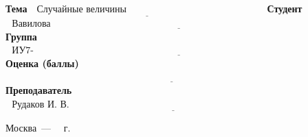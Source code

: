 \begin{titlepage}
	\noindent\textbf{Тема}           $\underline{\text{~~Случайные величины~~~~~~~~~~~~~~~~~~~~~~~~~~~~~~~~~~~~~~~~~~~}}$\newline\newline
	\noindent\textbf{Студент}        $\underline{\text{~~Вавилова В.Л.~~~~~~~~~~~~~~~~~~~~~~~~~~~~~~~~~~~~~~~~~~~~~~~~~~~~~~~~~~~~~~~~~~~~~~~~~~~~~~~~~~~~~~~~~~~~~~~}}$\newline\newline
	\noindent\textbf{Группа}         $\underline{\text{~~ИУ7-74Б~~~~~~~~~~~~~~~~~~~~~~~~~~~~~~~~~~~~~~~~~~~~~~~~~~~~~~~~~~~~~~~~~~~~~~~~~~~~~~~~~~~~~~~~~~~~~~~~~~~~~~}}$\newline\newline
	\noindent\textbf{Оценка (баллы)} $\underline{\text{~~~~~~~~~~~~~~~~~~~~~~~~~~~~~~~~~~~~~~~~~~~~~~~~~~~~~~~~~~~~~~~~~~~~~~~~~~~~~~~~~~~~~~~~~~~~~~~~~~~~~~~~}}$\newline\newline
	\noindent\textbf{Преподаватель}  $\underline{\text{~~Рудаков И. В.~~~~~~~~~~~~~~~~~~~~~~~~~~~~~~~~~~~~~~~~~~~~~~~~~~~~~~~~~~~~~~~~~~~~~~~~~~~~~~~~~~~~~}}$\newline	
	\begin{center}
		\vfill
		Москва~---~\the\year
		~г.
	\end{center}
	\restoregeometry
\end{titlepage}

